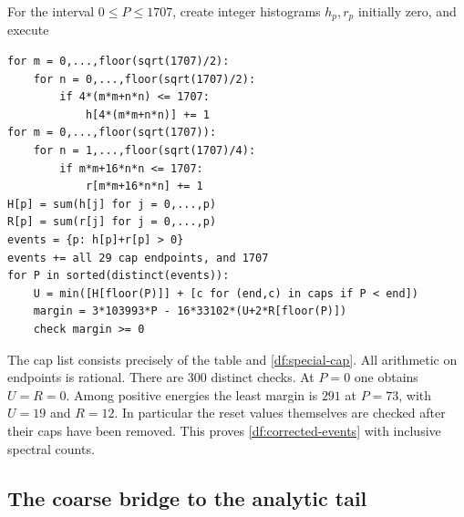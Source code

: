 \documentclass[11pt,reqno]{amsart}
\numberwithin{equation}{section}
\begin{document}
For the interval $0\le P\le1707$, create integer histograms $h_p,r_p$
initially zero, and execute
\begin{verbatim}
for m = 0,...,floor(sqrt(1707)/2):
    for n = 0,...,floor(sqrt(1707)/2):
        if 4*(m*m+n*n) <= 1707:
            h[4*(m*m+n*n)] += 1
for m = 0,...,floor(sqrt(1707)):
    for n = 1,...,floor(sqrt(1707)/4):
        if m*m+16*n*n <= 1707:
            r[m*m+16*n*n] += 1
H[p] = sum(h[j] for j = 0,...,p)
R[p] = sum(r[j] for j = 0,...,p)
events = {p: h[p]+r[p] > 0}
events += all 29 cap endpoints, and 1707
for P in sorted(distinct(events)):
    U = min([H[floor(P)]] + [c for (end,c) in caps if P < end])
    margin = 3*103993*P - 16*33102*(U+2*R[floor(P)])
    check margin >= 0
\end{verbatim}
The cap list consists precisely of the table and
\eqref{df:special-cap}. All arithmetic on endpoints is rational.
There are 300 distinct checks. At $P=0$ one obtains $U=R=0$.
Among positive energies the least margin is $291$ at $P=73$,
with $U=19$ and $R=12$. In particular the reset values themselves
are checked after their caps have been removed. This proves
\eqref{df:corrected-events} with inclusive spectral counts.

\subsection{The coarse bridge to the analytic tail}
\end{document}
